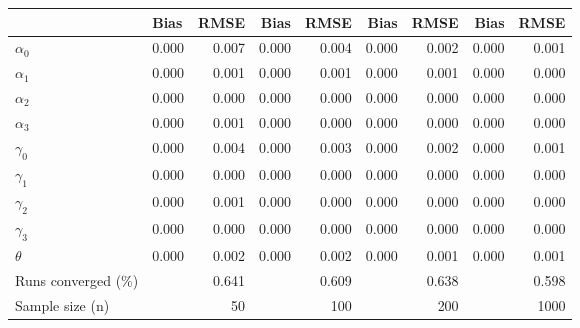
\begin{tabular}[t]{llrrrrrrr}
\toprule
  & Bias & RMSE & Bias & RMSE & Bias & RMSE & Bias & RMSE\\
\midrule
$\alpha_{0}$ & 0.000 & 0.007 & 0.000 & 0.004 & 0.000 & 0.002 & 0.000 & 0.001\\
$\alpha_{1}$ & 0.000 & 0.001 & 0.000 & 0.001 & 0.000 & 0.001 & 0.000 & 0.000\\
$\alpha_{2}$ & 0.000 & 0.000 & 0.000 & 0.000 & 0.000 & 0.000 & 0.000 & 0.000\\
$\alpha_{3}$ & 0.000 & 0.001 & 0.000 & 0.000 & 0.000 & 0.000 & 0.000 & 0.000\\
$\gamma_{0}$ & 0.000 & 0.004 & 0.000 & 0.003 & 0.000 & 0.002 & 0.000 & 0.001\\
$\gamma_{1}$ & 0.000 & 0.000 & 0.000 & 0.000 & 0.000 & 0.000 & 0.000 & 0.000\\
$\gamma_{2}$ & 0.000 & 0.001 & 0.000 & 0.000 & 0.000 & 0.000 & 0.000 & 0.000\\
$\gamma_{3}$ & 0.000 & 0.000 & 0.000 & 0.000 & 0.000 & 0.000 & 0.000 & 0.000\\
$\theta$ & 0.000 & 0.002 & 0.000 & 0.002 & 0.000 & 0.001 & 0.000 & 0.001\\
Runs converged (\%) &  & 0.641 &  & 0.609 &  & 0.638 &  & 0.598\\
Sample size (n) &  & 50 &  & 100 &  & 200 &  & 1000\\
\bottomrule
\end{tabular}
